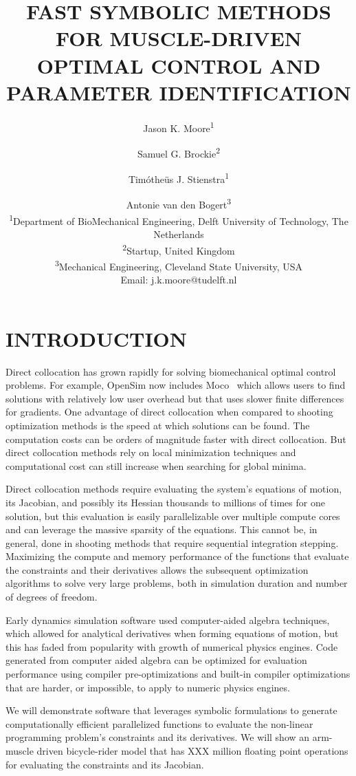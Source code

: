 \documentclass[11pt,twocolumn]{article}
\title{\textbf{
  FAST SYMBOLIC METHODS FOR MUSCLE-DRIVEN\\
  OPTIMAL CONTROL AND PARAMETER IDENTIFICATION
}}
\author{
Jason K. Moore\textsuperscript{1}\and
Samuel G. Brockie\textsuperscript{2}\and
Timótheüs J. Stienstra\textsuperscript{1}\and
Antonie van den Bogert\textsuperscript{3}\\
\textsuperscript{1}Department of BioMechanical Engineering, Delft University of Technology, The Netherlands\\
\textsuperscript{2}Startup, United Kingdom\\
\textsuperscript{3}Mechanical Engineering, Cleveland State University, USA\\
Email: j.k.moore@tudelft.nl}
\date{}
\begin{document}
\pagestyle{fancy}
\lhead{}
\maketitle
\section*{INTRODUCTION}
%
Direct collocation has grown rapidly for solving biomechanical optimal control
problems. For example, OpenSim now includes Moco~\cite{Dembia2019} which allows
users to find solutions with relatively low user overhead but that uses slower finite differences for gradients. One advantage of
direct collocation when compared to shooting optimization methods is the speed
at which solutions can be found. The computation costs can be orders of
magnitude faster with direct collocation. But direct collocation methods rely on
local minimization techniques and computational cost can still increase when
searching for global minima.

Direct collocation methods require evaluating the system's equations of motion,
its Jacobian, and possibly its Hessian thousands to millions of times for one
solution, but this evaluation is easily parallelizable over multiple compute
cores and can leverage the massive sparsity of the equations. This cannot be, in
general, done in shooting methods that require sequential integration stepping.
Maximizing the compute and memory performance of the functions that evaluate the
constraints and their derivatives allows the subsequent optimization algorithms
to solve very large problems, both in simulation duration and number of degrees
of freedom.

Early dynamics simulation software used computer-aided algebra techniques, which
allowed for analytical derivatives when forming equations of motion, but this
has faded from popularity with growth of numerical physics engines. Code
generated from computer aided algebra can be optimized for evaluation
performance using compiler pre-optimizations and built-in compiler optimizations
that are harder, or impossible, to apply to numeric physics engines.

We will demonstrate software that leverages symbolic formulations to generate
computationally efficient parallelized functions to evaluate the non-linear
programming problem's constraints and its derivatives. We will show an
arm-muscle driven bicycle-rider model that has XXX million floating point
operations for evaluating the constraints and its Jacobian.
\end{document}

